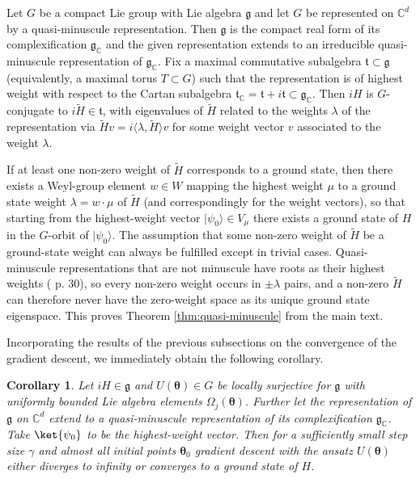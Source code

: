 \documentclass{article}
\renewcommand{\vec}[1]{\ensuremath{\boldsymbol{#1}}}
\newtheorem{corollary}{Corollary}
\begin{document}
Let $G$ be a compact Lie group with Lie algebra $\mathfrak g$ and let $G$ be represented on $\mathds{C}^d$ by a quasi-minuscule representation.
Then \(\mathfrak{g}\) is the compact real form of its complexification $\mathfrak g_{\mathds{C}}$ and the given representation extends to an irreducible quasi-minuscule representation of $\mathfrak g_{\mathds{C}}$.
Fix a maximal commutative subalgebra $\mathfrak t\subset\mathfrak g$ (equivalently, a maximal torus $T \subset G$) such that the representation is of highest weight with respect to the Cartan subalgebra $\mathfrak t_{\mathds{C}}=\mathfrak t+i\mathfrak t\subset\mathfrak g_{\mathds{C}}$.
Then $iH$ is $G$-conjugate to $i\tilde{H}\in\mathfrak t$, with eigenvalues of $\tilde{H}$ related to the weights $\lambda$ of the representation via $\tilde{H} v = i\langle\lambda,\tilde{H}\rangle v$ for some weight vector $v$ associated to the weight \(\lambda\).

If at least one non-zero weight of $\tilde{H}$ corresponds to a ground state, then there exists a Weyl-group element $w\in W$ mapping the highest weight $\mu$ to a ground state weight $\lambda=w\cdot\mu$ of $\tilde{H}$ (and correspondingly for the weight vectors), so that starting from the highest-weight vector $\lvert\psi_0\rangle\in V_\mu$ there exists a ground state of $H$ in the $G$-orbit of $\lvert\psi_0\rangle$.
The assumption that some non-zero weight of $\tilde{H}$ be a ground-state weight can always be fulfilled except in trivial cases.
Quasi-minuscule representations that are not minuscule have roots as their highest weights (\cite{stembridge_computational_2001} p. 30), so every non-zero weight occurs in $\pm\lambda$ pairs, and a non-zero $\tilde{H}$ can therefore never have the zero-weight space as its unique ground state eigenspace.
This proves Theorem \ref{thm:quasi-minuscule} from the main text.

Incorporating the results of the previous subsections on the convergence of the gradient descent, we immediately obtain the following corollary.
\begin{corollary}
    \label{cor:quasi-minuscule}
    Let $iH\in\mathfrak g$ and $U(\vec{\theta})\in G$ be locally surjective for $\mathfrak g$ with uniformly bounded Lie algebra elements $\Omega_j(\vec{\theta})$. Further let the representation of \(\mathfrak{g}\) on \(\mathds{C}^d\) extend to a quasi-minuscule representation of its complexification \(\mathfrak{g}_{\mathds{C}}\).
    Take \(\ket{\psi_0}\) to be the highest-weight vector.
    Then for a sufficiently small step size $\gamma$ and almost all initial points $\vec{\theta}_0$ gradient descent with the ansatz $U(\vec{\theta})$ either diverges to infinity or converges to a ground state of \(H\).
\end{corollary}
\end{document}
